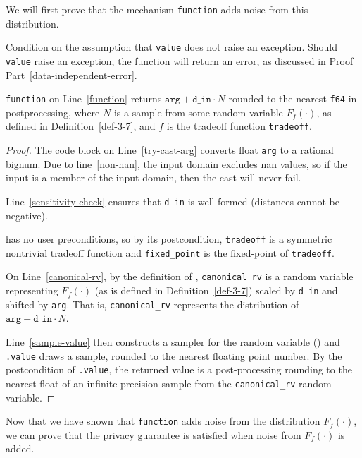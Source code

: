 \documentclass{article}
\begin{document}
We will first prove that the mechanism \texttt{function} adds noise from this distribution.
\begin{lemma}
    \label{function-correctness}
    Condition on the assumption that \texttt{value} does not raise an exception.
    Should \texttt{value} raise an exception, the function will return an error, as discussed in Proof Part~\ref{data-independent-error}.

    \texttt{function} on Line~\ref{function} returns $\texttt{arg} + \texttt{d\_in} \cdot N$ 
    rounded to the nearest \texttt{f64} in postprocessing,
    where $N$ is a sample from some random variable $F_f(\cdot)$, as defined in Definition~\ref{def-3-7},
    and $f$ is the tradeoff function \texttt{tradeoff}.
\end{lemma}

\begin{proof}
The code block on Line~\ref{try-cast-arg} converts float \texttt{arg} to a rational bignum.
Due to line~\ref{non-nan}, the input domain excludes nan values, 
so if the input is a member of the input domain, then the cast will never fail.

Line~\ref{sensitivity-check} ensures that \texttt{d\_in} is well-formed (distances cannot be negative).
    
 has no user preconditions,
so by its postcondition, \texttt{tradeoff} is a symmetric nontrivial tradeoff function
and \texttt{fixed\_point} is the fixed-point of \texttt{tradeoff}.

On Line~\ref{canonical-rv}, by the definition of ,
\texttt{canonical\_rv} is a random variable representing $F_f(\cdot)$ (as is defined in Definition~\ref{def-3-7}) 
scaled by \texttt{d\_in} and shifted by \texttt{arg}.
That is, \texttt{canonical\_rv} represents the distribution of $\texttt{arg} + \texttt{d\_in} \cdot N$.

Line~\ref{sample-value} then constructs a sampler for the random variable ()
and \texttt{.value} draws a sample, rounded to the nearest floating point number.
By the postcondition of \texttt{.value}, 
the returned value is a post-processing rounding to the nearest float
of an infinite-precision sample from the \texttt{canonical\_rv} random variable.
\end{proof}

Now that we have shown that \texttt{function} adds noise from the distribution $F_f(\cdot)$,
we can prove that the privacy guarantee is satisfied when noise from $F_f(\cdot)$ is added.
\end{document}
